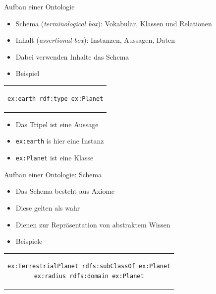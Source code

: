 \documentclass{beamer}
\begin{document}
\begin{frame}[fragile]{Aufbau einer Ontologie}

	\begin{itemize}
		\item Schema (\emph{terminological box}): Vokabular, Klassen und Relationen
		\item Inhalt (\emph{assertional box}): Instanzen, Aussagen, Daten 
		\item Dabei verwenden Inhalte das Schema
		\item Beispiel
	\end{itemize}	
	
    \begin{center}
    	\begin{tabular}{c}
    		\begin{lstlisting}
ex:earth rdf:type ex:Planet
    		\end{lstlisting}
    	\end{tabular}
    \end{center}
    
	\begin{itemize}
		\item Das Tripel ist eine Aussage
		\item \texttt{ex:earth} is hier eine Instanz
		\item \texttt{ex:Planet} ist eine Klasse
	\end{itemize}	
	
\end{frame}

\begin{frame}[fragile]{Aufbau einer Ontologie: Schema}
	
	\begin{itemize}
		\item Das Schema besteht aus Axiome
		\item Diese gelten als wahr
		\item Dienen zur Repräsentation von abstraktem Wissen
		\item Beispiele
	\end{itemize}	
	
	\begin{center}
		\begin{tabular}{c}
			\begin{lstlisting}
ex:TerrestrialPlanet rdfs:subClassOf ex:Planet
ex:radius rdfs:domain ex:Planet
			\end{lstlisting}
		\end{tabular}
	\end{center}	
	
\end{frame}
\end{document}
